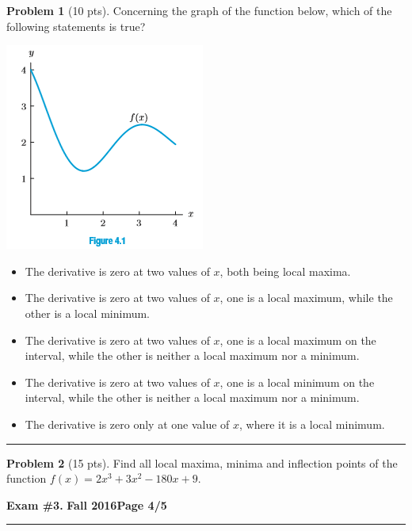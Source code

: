 \documentclass[12pt]{article}
\makeatletter
\theoremstyle{definition}
\newtheorem{problem}{Problem}
\newcommand*{\radiobutton}{%
  \@ifstar{\@radiobutton0}{\@radiobutton1}%
}
\newcommand*{\@radiobutton}[1]{%
  \begin{tikzpicture}
    \pgfmathsetlengthmacro\radius{height("X")/2}
    \draw[radius=\radius] circle;
    \ifcase#1 \fill[radius=.6*\radius] circle;\fi
  \end{tikzpicture}%
}
\makeatother
\begin{document}
\bigskip
\begin{problem}[10 pts]
Concerning the graph of the function below, which of the following statements is true?
\begin{center}
\includegraphics{3graph3}
\end{center}
\begin{itemize}
\item[\radiobutton] The derivative is zero at two values of $x$, both being local maxima.
\item[\radiobutton] The derivative is zero at two values of $x$, one is a local maximum, while the other is a local minimum.
\item[\radiobutton] The derivative is zero at two values of $x$, one is a local maximum on the interval, while the other is neither a local maximum nor a minimum.
\item[\radiobutton] The derivative is zero at two values of $x$, one is a local minimum on the interval, while the other is neither a local maximum nor a minimum.
\item[\radiobutton] The derivative is zero only at one value of $x$, where it is a local minimum.
\end{itemize}
\end{problem}

\hrule
\begin{problem}[15 pts]
Find all local maxima, minima and inflection points of the function $f(x) = 2x^3 + 3x^2-180x+9$.
\end{problem}

\newpage

\hfill{\large\bf Exam \#3.}\hfill{\large\bf
  Fall 2016}\hfill{\large\bf Page 4/5}\hrule

\bigskip
\end{document}
